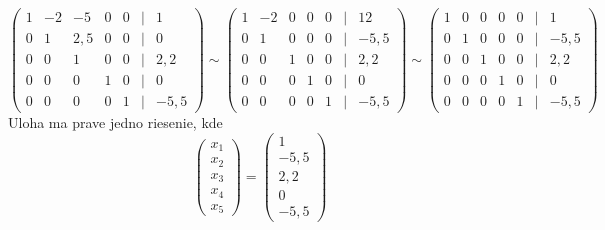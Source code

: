 \documentclass{article}
\begin{document}
\begin{enumerate}
\begin{description}
\[\begin{pmatrix}
    1& -2 &  -5 & 0 & 0 & | & 1 \\
    0 & 1 & 2,5 & 0 & 0 & | &  0 \\
    0 & 0 & 1 & 0 & 0 & | & 2,2 \\
    0 & 0 & 0 & 1 & 0 & | & 0 \\
    0 & 0 &  0 & 0 & 1 & | & -5,5
\end{pmatrix}
\sim
\begin{pmatrix}
    1& -2 &  0 & 0 & 0 & | & 12 \\
    0 & 1 & 0 & 0 & 0 & | &  -5,5 \\
    0 & 0 & 1 & 0 & 0 & | & 2,2 \\
    0 & 0 & 0 & 1 & 0 & | & 0 \\
    0 & 0 &  0 & 0 & 1 & | & -5,5
\end{pmatrix}
\sim
\begin{pmatrix}
    1& 0 &  0 & 0 & 0 & | & 1 \\
    0 & 1 & 0 & 0 & 0 & | &  -5,5 \\
    0 & 0 & 1 & 0 & 0 & | & 2,2 \\
    0 & 0 & 0 & 1 & 0 & | & 0 \\
    0 & 0 &  0 & 0 & 1 & | & -5,5
\end{pmatrix}
\]
Uloha ma prave jedno riesenie, kde 
\[
\begin{pmatrix}
    x_1 \\
    x_2 \\
    x_3 \\
    x_4 \\
    x_5
\end{pmatrix}
=
\begin{pmatrix}
    1 \\
    -5,5 \\
    2,2 \\
    0 \\
    -5,5
\end{pmatrix}
\]

\end{description}
\end{enumerate}
\end{document}
